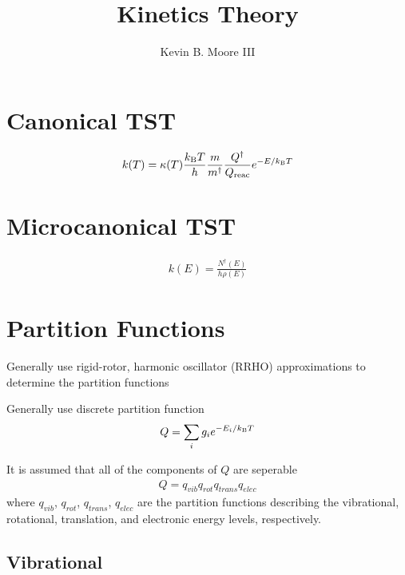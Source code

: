 \documentclass[11pt]{article}
\newcommand{\tnm}{\textnormal}
\newcommand{\kB}{k_{\tnm{B}}}
\begin{document}
\title{Kinetics Theory}
\author{Kevin B. Moore III}
\date{}
\maketitle

\section{Canonical TST}

\begin{align}
k(T) = \kappa (T) \frac{ \kB T }{ h } \frac{m}{m^{\dagger}} 
         \frac{ Q^{\dagger} }{ Q_{\tnm{reac}} } e^{ -E / \kB T }
\end{align}

\section{Microcanonical TST}

\begin{align}
k(E) =  \frac{ N^{\dagger}(E) }{ h\rho (E) } 
\end{align}

\section{Partition Functions}




Generally use rigid-rotor, harmonic oscillator (RRHO) approximations to determine the partition functions

Generally use discrete partition function
\begin{align*}
Q = \sum_{i} g_{i} e^{ -E_{i}/\kB T }
\end{align*}

It is assumed that all of the components of $Q$ are seperable
\begin{align*}
Q = q_{vib}q_{rot}q_{trans}q_{elec}
\end{align*}
where $q_{vib}$, $q_{rot}$, $q_{trans}$, $q_{elec}$ are the partition functions describing the vibrational, rotational, translation, and electronic energy levels, respectively.


\subsection{Vibrational}
\end{document}
